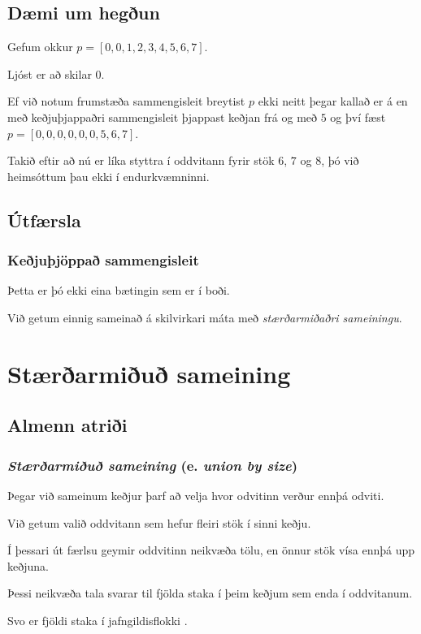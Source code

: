 \subsection{Dæmi um hegðun}
{
	{
		\item<1-> Gefum okkur
			$p = [0, 0, 1, 2, 3, 4, 5, 6, 7]$.
		\item<2-> Ljóst er að  skilar $0$.
		\item<3-> Ef við notum frumstæða sammengisleit breytist $p$ ekki neitt þegar kallað er á 
			en með keðjuþjappaðri sammengisleit þjappast keðjan frá og með $5$ og því fæst
			$p = [0, 0, 0, 0, 0, 0, 5, 6, 7]$.
		\item<4-> Takið eftir að nú er líka styttra í oddvitann fyrir stök $6$, $7$ og $8$, þó við heimsóttum þau ekki í endurkvæmninni.
	}
}

\subsection{Útfærsla}
{
	\frametitle{Keðjuþjöppað sammengisleit}
}

{
	{
		\item<1-> Þetta er þó ekki eina bætingin sem er í boði.
		\item<2-> Við getum einnig sameinað á skilvirkari máta með \emph{stærðarmiðaðri sameiningu}.
	}
}

\section{Stærðarmiðuð sameining}
\subsection{Almenn atriði}
{
	\frametitle{\emph{Stærðarmiðuð sameining} (e. \emph{union by size})}
	{
		\item<1-> Þegar við sameinum keðjur þarf að velja hvor odvitinn verður ennþá odviti.
		\item<2-> Við getum valið oddvitann sem hefur fleiri stök í sinni keðju.
		\item<3->[] 
		\item<4-> Í þessari út færlsu geymir oddvitinn neikvæða tölu, en önnur stök vísa ennþá upp keðjuna.
		\item<5-> Þessi neikvæða tala svarar til fjölda staka í þeim keðjum sem enda í oddvitanum.
		\item<6-> Svo  er fjöldi staka í jafngildisflokki .
	}
}

